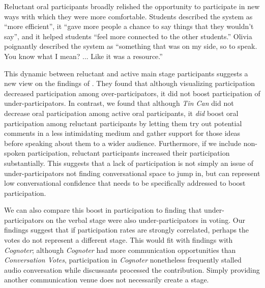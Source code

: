 Reluctant oral participants broadly relished the opportunity to participate in new ways with which they were more comfortable. Students described the system as ``more efficient'', it ``gave more people a chance to say things that they wouldn't say'', and it helped students ``feel more connected to the other students.'' Olivia poignantly described the system as ``something that was on my side, so to speak. You know what I mean? ... Like it was a resource.'' 


This dynamic between reluctant and active main stage participants suggests a new view on the findings of \citet{DiMicco:2007ie}. They found that although visualizing participation decreased participation among over-participators, it did not boost participation of under-participators. In contrast, we found that although \emph{Tin Can} did not decrease oral participation among active oral participants, it \emph{did} boost oral participation among reluctant participants by letting them try out potential comments in a less intimidating medium and gather support for those ideas before speaking about them to a wider audience. Furthermore, if we include non-spoken participation, reluctant participants increased their participation substantially. This suggests that a lack of participation is not simply an issue of under-participators not finding conversational space to jump in, but can represent low conversational confidence that needs to be specifically addressed to boost participation.



We can also compare this boost in participation to \citet{Bergstrom:2009ej} finding that under-participators on the verbal stage were also under-participators in voting. Our findings suggest that if participation rates are strongly correlated, perhaps the votes do not represent a different stage. This would fit with \citet{Tatar:1991jq} findings with \emph{Cognoter}; although \emph{Cognoter} had more communication opportunities than \emph{Conversation Votes}, participation in \emph{Cognoter} nonetheless frequently stalled audio conversation while discussants processed the contribution. Simply providing another communication venue does not necessarily create a stage. 

